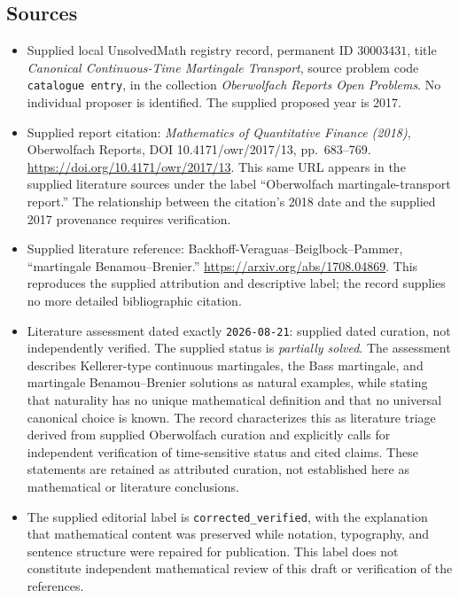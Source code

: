 \documentclass[11pt]{article}
\begin{document}
\subsection{Sources}
\begin{itemize}
\item Supplied local UnsolvedMath registry record, permanent ID \(30003431\), title \emph{Canonical Continuous-Time Martingale Transport}, source problem code \texttt{catalogue entry}, in the collection \emph{Oberwolfach Reports Open Problems}. No individual proposer is identified. The supplied proposed year is 2017.
\item Supplied report citation: \emph{Mathematics of Quantitative Finance (2018)}, Oberwolfach Reports, DOI 10.4171/owr/2017/13, pp.\ 683--769. \url{https://doi.org/10.4171/owr/2017/13}. This same URL appears in the supplied literature sources under the label ``Oberwolfach martingale-transport report.'' The relationship between the citation's 2018 date and the supplied 2017 provenance requires verification.
\item Supplied literature reference: Backhoff-Veraguas--Beiglbock--Pammer, ``martingale Benamou--Brenier.'' \url{https://arxiv.org/abs/1708.04869}. This reproduces the supplied attribution and descriptive label; the record supplies no more detailed bibliographic citation.
\item Literature assessment dated exactly \texttt{2026-08-21}: supplied dated curation, not independently verified. The supplied status is \emph{partially solved}. The assessment describes Kellerer-type continuous martingales, the Bass martingale, and martingale Benamou--Brenier solutions as natural examples, while stating that naturality has no unique mathematical definition and that no universal canonical choice is known. The record characterizes this as literature triage derived from supplied Oberwolfach curation and explicitly calls for independent verification of time-sensitive status and cited claims. These statements are retained as attributed curation, not established here as mathematical or literature conclusions.
\item The supplied editorial label is \texttt{corrected\_verified}, with the explanation that mathematical content was preserved while notation, typography, and sentence structure were repaired for publication. This label does not constitute independent mathematical review of this draft or verification of the references.
\end{itemize}
\end{document}
